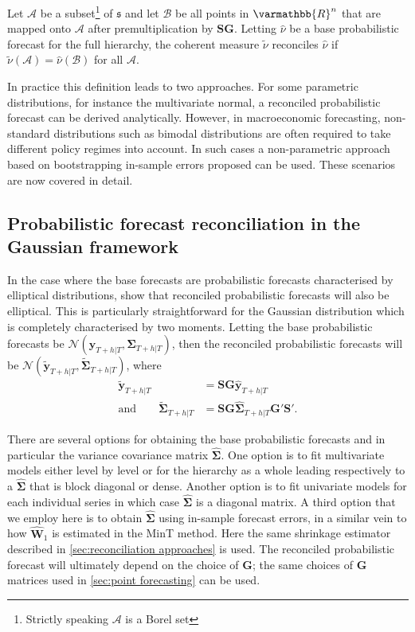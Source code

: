 \documentclass[graybox]{svmult}
\begin{document}
\begin{definition} Let $\mathcal{A}$ be a subset\footnote{Strictly speaking $\mathcal{A}$ is a Borel set} of $\mathfrak{s}$ and let $\mathcal{B}$ be all points in $\varmathbb{R}^n$ that are mapped onto $\mathcal{A}$ after premultiplication by $\bm{S}\bm{G}$. Letting $\hat{\nu}$ be a base probabilistic forecast for the full hierarchy, the coherent measure $\tilde{\nu}$ reconciles $\hat{\nu}$ if $\tilde{\nu}(\mathcal{A})=\hat{\nu}(\mathcal{B})$ for all $\mathcal{A}$.
\end{definition}

In practice this definition leads to two approaches. For some parametric distributions, for instance the multivariate normal, a reconciled probabilistic forecast can be derived analytically. However, in macroeconomic forecasting, non-standard distributions such as bimodal distributions are often required to take different policy regimes into account. In such cases a non-parametric approach based on bootstrapping in-sample errors proposed \citet{GamEtAl2018} can be used. These scenarios are now covered in detail.

\subsection{Probabilistic forecast reconciliation in the Gaussian framework}\label{sec:probrecgauss}

In the case where the base forecasts are probabilistic forecasts characterised by elliptical distributions, \citet{GamEtAl2018} show that reconciled probabilistic forecasts will also be elliptical. This is particularly straightforward for the Gaussian distribution which is completely characterised by two moments. Letting the base probabilistic forecasts be $\mathscr{N}(\bm{\hat{y}}_{T+h|T}, \hat{\bm{\Sigma}}_{T+h|T})$, then the reconciled probabilistic forecasts will be $\mathscr{N}(\bm{\tilde{y}}_{T+h|T}, \tilde{\bm{\Sigma}}_{T+h|T})$, where
\begin{align}\label{eq:rec mean}
	\bm{\tilde{y}}_{T+h|T} &= \bm{S}\bm{G}\bm{\hat{y}}_{T+h|T} \\
\text{and}\qquad\label{eq:rec var}
	\tilde{\bm{\Sigma}}_{T+h|T} &= \bm{S}\bm{G}\hat{\bm{\Sigma}}_{T+h|T}\bm{G}'\bm{S}'.
\end{align}

There are several options for obtaining the base probabilistic forecasts and in particular the variance covariance matrix $\hat{\bm{\Sigma}}$. One option is to fit multivariate models either level by level or for the hierarchy as a whole leading respectively to a $\hat{\bm \Sigma}$ that is block diagonal or dense. Another option is to fit univariate models for each individual series in which case $\hat{\bm{\Sigma}}$ is a diagonal matrix. A third option that we employ here is to obtain $\hat{\bm{\Sigma}}$ using in-sample forecast errors, in a similar vein to how $\hat{\bm{W}}_{1}$ is estimated in the MinT method. Here the same shrinkage estimator described in \autoref{sec:reconciliation approaches} is used. The reconciled probabilistic forecast will ultimately depend on the choice of $\bm{G}$; the same choices of $\bm{G}$ matrices used in \autoref{sec:point forecasting} can be used.
\end{document}
